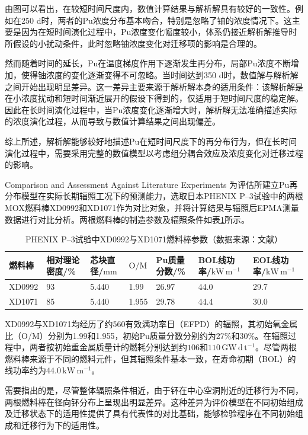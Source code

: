 由图可以看出，在较短时间尺度内，数值计算结果与解析解具有较好的一致性。例如在250 d时，两者的Pu浓度分布基本吻合，特别是忽略了铀的浓度情况下。这主要是因为在短时间演化过程中，Pu浓度变化幅度较小，体系仍接近解析解推导时所假设的小扰动条件，此时忽略铀浓度变化对迁移项的影响是合理的。

然而随着时间的延长，Pu在温度梯度作用下逐渐发生再分布，局部Pu浓度不断增加，使得铀浓度的变化逐渐变得不可忽略。当时间达到350 d时，数值解与解析解之间开始出现明显差异。这一差异主要来源于解析解本身的适用条件：该解析解是在小浓度扰动和短时间渐近展开的假设下得到的，仅适用于短时间尺度的稳定解。因此在长时间演化过程中，当Pu浓度变化逐渐增大时，解析解无法准确描述实际的浓度演化过程，从而导致与数值计算结果之间出现偏差。

综上所述，解析解能够较好地描述Pu在短时间尺度下的再分布行为，但在长时间演化过程中，需要采用完整的数值模型以考虑组分耦合效应及浓度变化对迁移过程的影响。

{Comparison and Assessment Against Literature Experiments}
为评估所建立Pu再分布模型在实际长期辐照工况下的预测能力，选取日本PHENIX P--3试验中的两根MOX燃料棒XD0992和XD1071\cite{zotero-item-2022}作为对比对象，并将计算结果与辐照后EPMA测量数据进行对比分析。两根燃料棒的制造参数及辐照条件如表\ref{tab:pu_experiment}所示。

\begin{table}[htbp]
	\centering
	\caption{PHENIX P--3试验中XD0992与XD1071燃料棒参数（数据来源：文献\cite{zotero-item-2022}）}
	\label{tab:pu_experiment}
	\begin{tabularx}{\textwidth}{X X X X X X X}
		\toprule
		燃料棒 & 相对理论密度/\% & 芯块直径/$\mathrm{mm}$ & $\mathrm{O/M}$ & Pu质量分数/\% &
		BOL线功率/$\mathrm{kW\,m^{-1}}$ & EOL线功率/$\mathrm{kW\,m^{-1}}$ \\
		\midrule
		XD0992 & 93 & 5.440 & 1.99  & 26.97 & 44.0 & 29.7 \\
		XD1071 & 85 & 5.440 & 1.955 & 29.78 & 44.4 & 30.0 \\
		\bottomrule
	\end{tabularx}
\end{table}

XD0992与XD1071均经历了约560有效满功率日（EFPD）的辐照，其初始氧金属比（O/M）分别为1.99和1.955，初始Pu质量分数分别约为27\%和30\%。在辐照过程中，两者按初始重金属质量计的燃耗分别达到约$106$和$110\,\mathrm{GW\,d\,t^{-1}}$。尽管两根燃料棒来源于不同的燃料元件，但其辐照条件基本一致，在寿命初期（BOL）的线功率约为$44.0\,\mathrm{kW\,m^{-1}}$。

需要指出的是，尽管整体辐照条件相近，由于钚在中心空洞附近的迁移行为不同，两根燃料棒在径向钚分布上呈现出明显差异。这种差异为评价模型在不同初始组成及迁移状态下的适用性提供了具有代表性的对比基础，能够检验程序在不同初始组成和迁移行为下的适用性。

